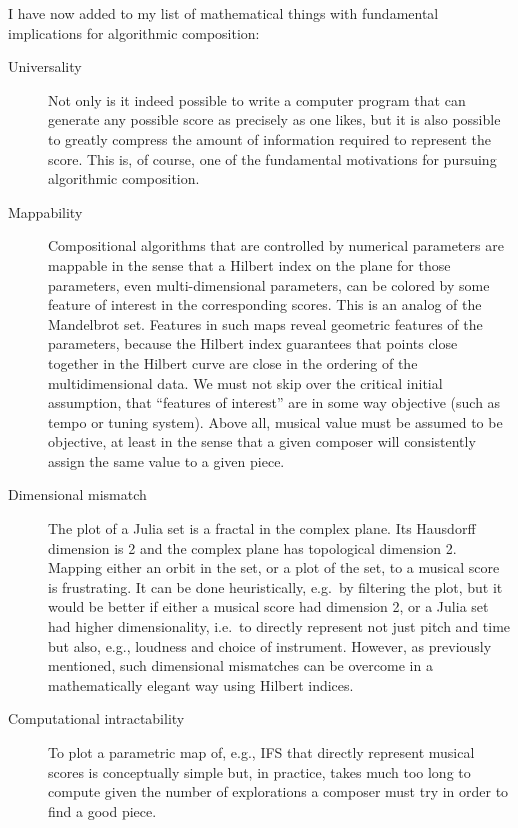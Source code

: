 \documentclass[11pt]{scrartcl}
\begin{document}
I have now added to my list of mathematical things with fundamental implications for algorithmic composition:

\begin{description}
\item[Universality] Not only is it indeed possible to write a computer program that can generate any possible score as precisely as one likes, but it is also possible to greatly compress the amount of information required to represent the score. This is, of course, one of the fundamental motivations for pursuing algorithmic composition.
\item[Mappability] Compositional algorithms that are controlled by numerical parameters are mappable in the sense that a Hilbert index \parencite{patrick1968mapping, hamilton2007compact} on the plane for those parameters, even multi-dimensional parameters, can be colored by some feature of interest in the corresponding scores. This is an analog of the Mandelbrot set. Features in such maps reveal geometric features of the parameters, because the Hilbert index guarantees that points close together in the Hilbert curve are close in the ordering of the multidimensional data. We must not skip over the critical initial assumption, that ``features of interest'' are in some way objective (such as tempo or tuning system). Above all, musical value must be assumed to be objective, at least in the sense that a given composer will consistently assign the same value to a given piece.
\item[Dimensional mismatch] The plot of a Julia set is a fractal in the complex plane. Its Hausdorff dimension is 2 and the complex plane has topological dimension 2. Mapping either an orbit in the set, or a plot of the set, to a musical score is frustrating. It can be done heuristically, e.g.\ by filtering the plot, but it would be better if either a musical score had dimension 2, or a Julia set had higher dimensionality, i.e.\ to directly represent not just pitch and time but also, e.g., loudness and choice of instrument. However, as previously mentioned, such  dimensional mismatches can be overcome in a mathematically elegant way using Hilbert indices.
\item[Computational intractability] To plot a parametric map of, e.g., IFS that directly represent musical scores is conceptually simple but, in practice, takes much too long to compute given the number of explorations a composer must try in order to find a good piece.
\end{description}
\end{document}
